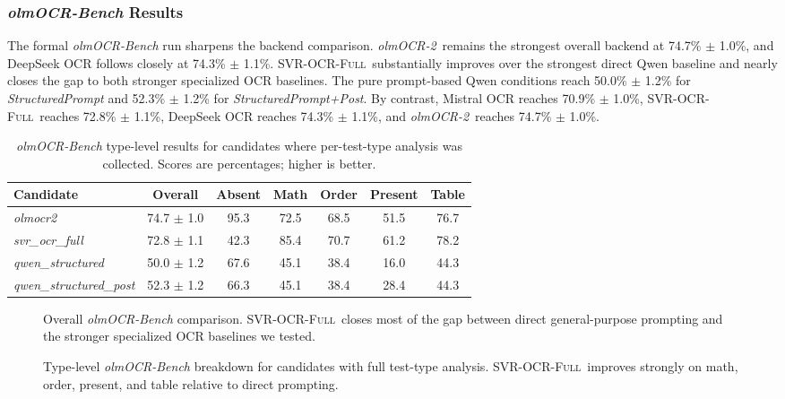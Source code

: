 \documentclass[conference]{IEEEtran}
\newcommand{\papername}[1]{\textit{#1}}
\newcommand{\svrocr}{\textsc{SVR-OCR-Full}}
\newcommand{\olmocr}{\papername{olmOCR-2}}
\begin{document}
\subsubsection{\papername{olmOCR-Bench} Results}

The formal \papername{olmOCR-Bench} run sharpens the backend comparison. \olmocr\ remains the strongest overall backend at 74.7\% $\pm$ 1.0\%, and DeepSeek OCR follows closely at 74.3\% $\pm$ 1.1\%. \svrocr\ substantially improves over the strongest direct Qwen baseline and nearly closes the gap to both stronger specialized OCR baselines. The pure prompt-based Qwen conditions reach 50.0\% $\pm$ 1.2\% for \papername{StructuredPrompt} and 52.3\% $\pm$ 1.2\% for \papername{StructuredPrompt+Post}. By contrast, Mistral OCR reaches 70.9\% $\pm$ 1.0\%, \svrocr\ reaches 72.8\% $\pm$ 1.1\%, DeepSeek OCR reaches 74.3\% $\pm$ 1.1\%, and \olmocr\ reaches 74.7\% $\pm$ 1.0\%.

\begin{table}[t]
\caption{\papername{olmOCR-Bench} type-level results for candidates where per-test-type analysis was collected. Scores are percentages; higher is better.}
\label{tab:olmocr-bench}
\centering
\begin{tabular}{lcccccc}
\toprule
Candidate & Overall & Absent & Math & Order & Present & Table \\
\midrule
\papername{olmocr2} & 74.7 $\pm$ 1.0 & 95.3 & 72.5 & 68.5 & 51.5 & 76.7 \\
\papername{svr\_ocr\_full} & 72.8 $\pm$ 1.1 & 42.3 & 85.4 & 70.7 & 61.2 & 78.2 \\
\papername{qwen\_structured} & 50.0 $\pm$ 1.2 & 67.6 & 45.1 & 38.4 & 16.0 & 44.3 \\
\papername{qwen\_structured\_post} & 52.3 $\pm$ 1.2 & 66.3 & 45.1 & 38.4 & 28.4 & 44.3 \\
\bottomrule
\end{tabular}
\end{table}

\begin{figure}[t]
\centering

\caption{Overall \papername{olmOCR-Bench} comparison. \svrocr\ closes most of the gap between direct general-purpose prompting and the stronger specialized OCR baselines we tested.}
\label{fig:backend-overall}
\end{figure}

\begin{figure}[t]
\centering

\caption{Type-level \papername{olmOCR-Bench} breakdown for candidates with full test-type analysis. \svrocr\ improves strongly on math, order, present, and table relative to direct prompting.}
\label{fig:backend-category}
\end{figure}
\end{document}
